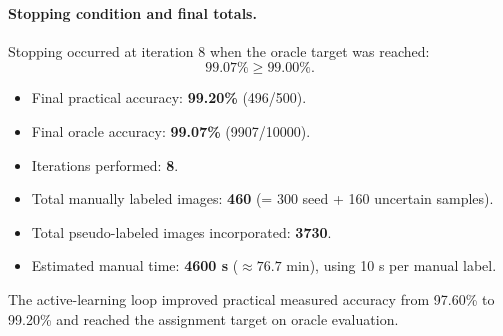 \paragraph{Stopping condition and final totals.}
Stopping occurred at iteration 8 when the oracle target was reached:
\[
99.07\% \ge 99.00\%.
\]

\begin{itemize}
    \item Final practical accuracy: \textbf{99.20\%} (496/500).
    \item Final oracle accuracy: \textbf{99.07\%} (9907/10000).
    \item Iterations performed: \textbf{8}.
    \item Total manually labeled images: \textbf{460} (= 300 seed + 160 uncertain samples).
    \item Total pseudo-labeled images incorporated: \textbf{3730}.
    \item Estimated manual time: \textbf{4600 s} ($\approx 76.7$ min), using 10 s per manual label.
\end{itemize}

The active-learning loop improved practical measured accuracy from 97.60\% to 99.20\% and reached the assignment target on oracle evaluation.
